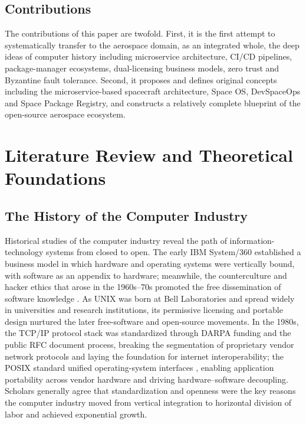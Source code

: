 \documentclass[11pt]{article}
\begin{document}
\subsection{Contributions}
The contributions of this paper are twofold. First, it is the first attempt to systematically transfer to the aerospace domain, as an integrated whole, the deep ideas of computer history including microservice architecture, CI/CD pipelines, package-manager ecosystems, dual-licensing business models, zero trust and Byzantine fault tolerance. Second, it proposes and defines original concepts including the microservice-based spacecraft architecture, Space OS, DevSpaceOps and Space Package Registry, and constructs a relatively complete blueprint of the open-source aerospace ecosystem.

\section{Literature Review and Theoretical Foundations}
\subsection{The History of the Computer Industry}
Historical studies of the computer industry reveal the path of information-technology systems from closed to open. The early IBM System/360 established a business model in which hardware and operating systems were vertically bound, with software as an appendix to hardware; meanwhile, the counterculture and hacker ethics that arose in the 1960s--70s promoted the free dissemination of software knowledge \cite{levy1984,raymond1999}. As UNIX was born at Bell Laboratories and spread widely in universities and research institutions, its permissive licensing and portable design nurtured the later free-software and open-source movements. In the 1980s, the TCP/IP protocol stack was standardized through DARPA funding and the public RFC document process, breaking the segmentation of proprietary vendor network protocols and laying the foundation for internet interoperability; the POSIX standard unified operating-system interfaces \cite{rfc2026,posix2017}, enabling application portability across vendor hardware and driving hardware--software decoupling. Scholars generally agree that standardization and openness were the key reasons the computer industry moved from vertical integration to horizontal division of labor and achieved exponential growth.
\end{document}
